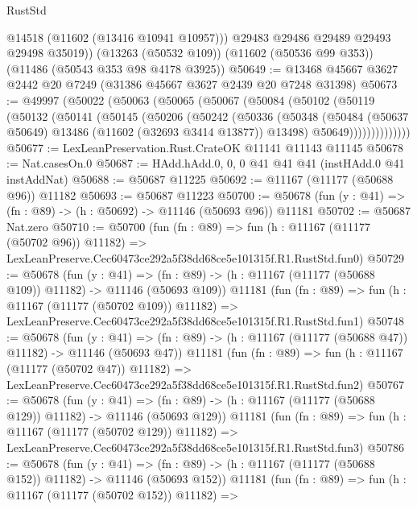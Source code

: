 \begin{lexlean}{RustStd}
\begin{coremodule}
          @14518
          (@11602 (@13416 @10941 @10957)))
        @29483
        @29486
        @29489
        @29493
        @29498
        @35019))
    (@13263 (@50532 @109))
    (@11602 (@50536 @99 @353))
    (@11486 (@50543 @353 @98 @4178 @3925))
@50649 := @13468 @45667 @3627 @2442 @20 @7249 (@31386 @45667 @3627 @2439 @20 @7248 @31398)
@50673 := @49997
    (@50022
      (@50063
        (@50065
          (@50067
            (@50084
              (@50102
                (@50119
                  (@50132
                    (@50141
                      (@50145
                        (@50206
                          (@50242
                            (@50336
                              (@50348
                                (@50484
                                  (@50637 @50649)
                                  @13486
                                  (@11602 (@32693 @3414 @13877))
                                  @13498)
                                @50649))))))))))))))
@50677 := LexLeanPreservation.Rust.CrateOK @11141 @11143 @11145
@50678 := Nat.casesOn.{0}
@50687 := HAdd.hAdd.{0, 0, 0} @41 @41 @41 (instHAdd.{0} @41 instAddNat)
@50688 := @50687 @11225
@50692 := @11167 (@11177 (@50688 @96)) @11182
@50693 := @50687 @11223
@50700 := @50678 (fun (y : @41) => (fn : @89) -> (h : @50692) -> @11146 (@50693 @96)) @11181
@50702 := @50687 Nat.zero
@50710 := @50700
    (fun (fn : @89) =>
    fun (h : @11167 (@11177 (@50702 @96)) @11182) =>
    LexLeanPreserve.Cec60473ce292a5f38dd68ce5e101315f.R1.RustStd.fun0)
@50729 := @50678
    (fun (y : @41) =>
    (fn : @89) -> (h : @11167 (@11177 (@50688 @109)) @11182) -> @11146 (@50693 @109))
    @11181
    (fun (fn : @89) =>
    fun (h : @11167 (@11177 (@50702 @109)) @11182) =>
    LexLeanPreserve.Cec60473ce292a5f38dd68ce5e101315f.R1.RustStd.fun1)
@50748 := @50678
    (fun (y : @41) =>
    (fn : @89) -> (h : @11167 (@11177 (@50688 @47)) @11182) -> @11146 (@50693 @47))
    @11181
    (fun (fn : @89) =>
    fun (h : @11167 (@11177 (@50702 @47)) @11182) =>
    LexLeanPreserve.Cec60473ce292a5f38dd68ce5e101315f.R1.RustStd.fun2)
@50767 := @50678
    (fun (y : @41) =>
    (fn : @89) -> (h : @11167 (@11177 (@50688 @129)) @11182) -> @11146 (@50693 @129))
    @11181
    (fun (fn : @89) =>
    fun (h : @11167 (@11177 (@50702 @129)) @11182) =>
    LexLeanPreserve.Cec60473ce292a5f38dd68ce5e101315f.R1.RustStd.fun3)
@50786 := @50678
    (fun (y : @41) =>
    (fn : @89) -> (h : @11167 (@11177 (@50688 @152)) @11182) -> @11146 (@50693 @152))
    @11181
    (fun (fn : @89) =>
    fun (h : @11167 (@11177 (@50702 @152)) @11182) =>

\end{coremodule}
\end{lexlean}
